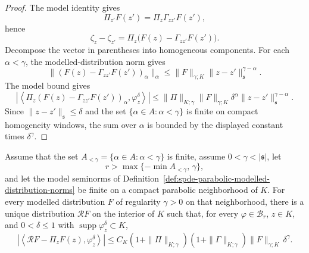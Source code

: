 \begin{proof}
The model identity gives
\[
  \Pi_{z'}F(z')=\Pi_z\Gamma_{zz'}F(z') ,
\]
hence
\[
  \zeta_z-\zeta_{z'}
  =
  \Pi_z\bigl(F(z)-\Gamma_{zz'}F(z')\bigr).
\]
Decompose the vector in parentheses into homogeneous components.  For each
\(\alpha<\gamma\), the modelled-distribution norm gives
\[
  \|(F(z)-\Gamma_{zz'}F(z'))_\alpha\|_\alpha
  \leq
  \|F\|_{\gamma;K}\|z-z'\|_{\mathfrak s}^{\gamma-\alpha}.
\]
The model bound gives
\[
  \left|
  \left\langle
    \Pi_z (F(z)-\Gamma_{zz'}F(z'))_\alpha,
    \varphi_z^\delta
  \right\rangle
  \right|
  \leq
  \|\Pi\|_{K;\gamma}\|F\|_{\gamma;K}
  \delta^\alpha\|z-z'\|_{\mathfrak s}^{\gamma-\alpha}.
\]
Since \(\|z-z'\|_{\mathfrak s}\leq\delta\) and the set
\(\{\alpha\in A:\alpha<\gamma\}\) is finite on compact homogeneity windows,
the sum over \(\alpha\) is bounded by the displayed constant times
\(\delta^\gamma\).
\end{proof}

\begin{theorem}
\label{thm:spde-compact-reconstruction}
Assume that the set \(A_{<\gamma}=\{\alpha\in A:\alpha<\gamma\}\) is finite,
assume \(0<\gamma<|\mathfrak s|\),
let
\[
  r>\max\{-\min A_{<\gamma},\,\gamma\},
\]
and let the model seminorms of
Definition~\ref{def:spde-parabolic-modelled-distribution-norms} be finite on
a compact parabolic neighborhood of \(K\).  For every modelled distribution
\(F\) of regularity \(\gamma>0\) on that neighborhood, there is a unique
distribution \(\mathcal RF\) on the interior of \(K\) such that, for every
\(\varphi\in\mathcal B_r\), \(z\in K\), and \(0<\delta\leq1\) with
\(\operatorname{supp}\varphi_z^\delta\subset K\),
\begin{equation}
  \left|
    \left\langle
      \mathcal RF-\Pi_zF(z),\varphi_z^\delta
    \right\rangle
  \right|
  \leq
  C_K
  (1+\|\Pi\|_{K;\gamma})(1+\|\Gamma\|_{K;\gamma})
  \|F\|_{\gamma;K}\,\delta^\gamma .
  \label{eq:spde-reconstruction-bound}
\end{equation}
\end{theorem}


